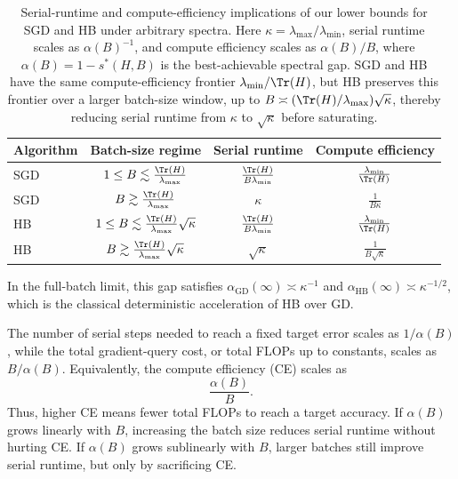 \documentclass{article}
\begin{document}
\begin{table}[!ht]
\centering
\small
\begin{tabular}{lccc}
\toprule
Algorithm & Batch-size regime & Serial runtime & Compute efficiency \\
\midrule
SGD
& $1 \le B \lesssim \frac{\Tr(H)}{\lambda_{\max}}$
& $\frac{\Tr(H)}{B\lambda_{\min}}$
& $\frac{\lambda_{\min}}{\Tr(H)}$
\\
SGD
& $B \gtrsim \frac{\Tr(H)}{\lambda_{\max}}$
& $\kappa$
& $\frac{1}{B\kappa}$
\\
\midrule
HB
& $1 \le B \lesssim \frac{\Tr(H)}{\lambda_{\max}}\sqrt{\kappa}$
& $\frac{\Tr(H)}{B\lambda_{\min}}$
& $\frac{\lambda_{\min}}{\Tr(H)}$
\\
HB
& $B \gtrsim \frac{\Tr(H)}{\lambda_{\max}}\sqrt{\kappa}$
& $\sqrt{\kappa}$
& $\frac{1}{B\sqrt{\kappa}}$
\\
\bottomrule
\end{tabular}
\vspace{2mm}
\caption{
Serial-runtime and compute-efficiency implications of our lower bounds for SGD
and HB under arbitrary spectra. Here
$\kappa=\lambda_{\max}/\lambda_{\min}$, serial runtime scales as
$\alpha(B)^{-1}$, and compute efficiency scales as $\alpha(B)/B$, where
$\alpha(B)=1-s^*(H,B)$ is the best-achievable spectral gap. SGD and HB have the
same compute-efficiency frontier $\lambda_{\min}/\Tr(H)$, but HB preserves this
frontier over a larger batch-size window, up to
$B\asymp (\Tr(H)/\lambda_{\max})\sqrt{\kappa}$, thereby reducing serial runtime
from $\kappa$ to $\sqrt{\kappa}$ before saturating.
}
\vspace{-5mm}
\label{tab:sgd-hb-ce-serial}
\end{table}

In the full-batch limit, this gap satisfies $
\alpha_{\mathrm{GD}}(\infty)\asymp \kappa^{-1}$ and 
$\alpha_{\mathrm{HB}}(\infty)\asymp \kappa^{-1/2}$,
which is the classical deterministic acceleration of HB over GD.

The number of serial steps needed to reach a fixed target error scales as
\(1/\alpha(B)\), while the total gradient-query cost, or total FLOPs up to
constants, scales as \(B/\alpha(B)\). Equivalently, the compute efficiency
(CE) scales as
\[
\frac{\alpha(B)}{B}.
\]
Thus, higher CE means fewer total FLOPs to reach a target accuracy. If
\(\alpha(B)\) grows linearly with \(B\), increasing the batch size reduces
serial runtime without hurting CE. If \(\alpha(B)\) grows sublinearly with
\(B\), larger batches still improve serial runtime, but only by sacrificing CE.
\end{document}
